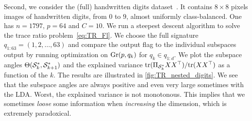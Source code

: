Second, we consider the (full) handwritten digits dataset~\citep{alpaydin_optical_1998}. It contains $8 \times 8$ pixels images of handwritten digits, from $0$ to $9$, almost uniformly class-balanced. One has $n = 1797$, $p=64$ and $C = 10$.
We run a steepest descent algorithm to solve the trace ratio problem~\eqref{eq:TR_Fl}. We choose the full signature $q_{1:63} = (1, 2, \dots, 63)$ and compare the output flag to the individual subspaces output by running optimization on $\Gr(p, q_k)$ for $q_k \in q_{1:d}$.
We plot the subspace angles $\Theta(\S_k^*, \S_{k+1}^*)$ and the explained variance ${\operatorname{tr}(\Pi_{\S_k^*} X X\T)} / {\operatorname{tr}(X X\T)}$ as a function of the $k$. The results are illustrated in \autoref{fig:TR_nested_digits}.
We see that the subspace angles are always positive and even very large sometimes with the LDA. Worst, the explained variance is not monotonous. This implies that we sometimes \textit{loose} some information when \textit{increasing} the dimension, which is extremely paradoxical.

